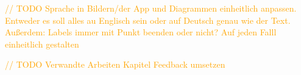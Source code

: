 \textcolor{orange}{// TODO Sprache in Bildern/der App und Diagrammen einheitlich anpassen. Entweder es soll alles au Englisch sein oder auf Deutsch genau wie der Text. Außerdem: Labels immer mit Punkt beenden oder nicht? Auf jeden Falll einheitlich gestalten}

\textcolor{orange}{// TODO Verwandte Arbeiten Kapitel Feedback umsetzen}












